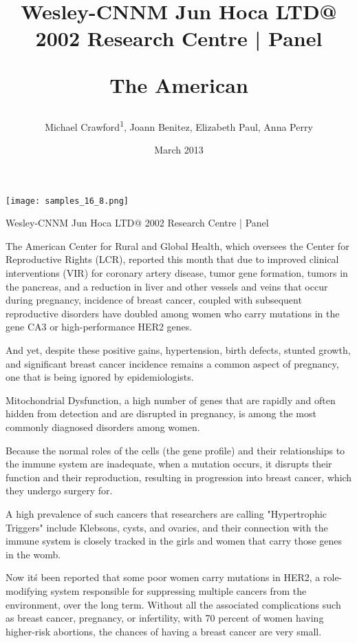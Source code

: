 \documentclass{article}
\title{Wesley-CNNM Jun Hoca LTD@ 2002 Research Centre | Panel

The American}
\author{Michael Crawford\textsuperscript{1},  Joann Benitez,  Elizabeth Paul,  Anna Perry}
\affil{\textsuperscript{1}Columbia University}
\date{March 2013}
\begin{document}
\maketitle

\begin{center}
\begin{minipage}{0.75\linewidth}
\texttt{[image: samples\_16\_8.png]}
\end{minipage}
\end{center}

Wesley-CNNM Jun Hoca LTD@ 2002 Research Centre | Panel

The American Center for Rural and Global Health, which oversees the Center for Reproductive Rights (LCR), reported this month that due to improved clinical interventions (VIR) for coronary artery disease, tumor gene formation, tumors in the pancreas, and a reduction in liver and other vessels and veins that occur during pregnancy, incidence of breast cancer, coupled with subsequent reproductive disorders have doubled among women who carry mutations in the gene CA3 or high-performance HER2 genes.

And yet, despite these positive gains, hypertension, birth defects, stunted growth, and significant breast cancer incidence remains a common aspect of pregnancy, one that is being ignored by epidemiologists.

Mitochondrial Dysfunction, a high number of genes that are rapidly and often hidden from detection and are disrupted in pregnancy, is among the most commonly diagnosed disorders among women.

Because the normal roles of the cells (the gene profile) and their relationships to the immune system are inadequate, when a mutation occurs, it disrupts their function and their reproduction, resulting in progression into breast cancer, which they undergo surgery for.

A high prevalence of such cancers that researchers are calling "Hypertrophic Triggers" include Klebsons, cysts, and ovaries, and their connection with the immune system is closely tracked in the girls and women that carry those genes in the womb.

Now it\'s been reported that some poor women carry mutations in HER2, a role-modifying system responsible for suppressing multiple cancers from the environment, over the long term. Without all the associated complications such as breast cancer, pregnancy, or infertility, with 70 percent of women having higher-risk abortions, the chances of having a breast cancer are very small.
\end{document}
